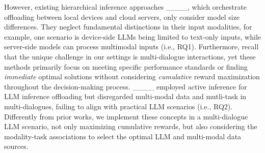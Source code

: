 However, existing hierarchical inference approaches ____, which orchestrate offloading between local devices and cloud servers, only consider model size differences. They neglect fundamental distinctions in their input modalities, for example, one scenario is device-side LLMs being limited to text-only inputs, while server-side models can process multimodal inputs (i.e., RQ1). Furthermore, recall that the unique challenge in our settings is multi-dialogue interactions, yet these methods primarily focus on meeting specific performance standards or finding \textit{immediate} optimal solutions without considering \textit{cumulative} reward maximization throughout the decision-making process. ____ employed active inference for LLM inference offloading but disregarded multi-modal data and mutli-task in multi-dialogues, failing to align with practical LLM scenarios (i.e., RQ2). Differently from prior works, we implement these concepts in a multi-dialogue LLM scenario, not only maximizing cumulative rewards, but also considering the modality-task associations to select the optimal LLM and multi-modal data sources.